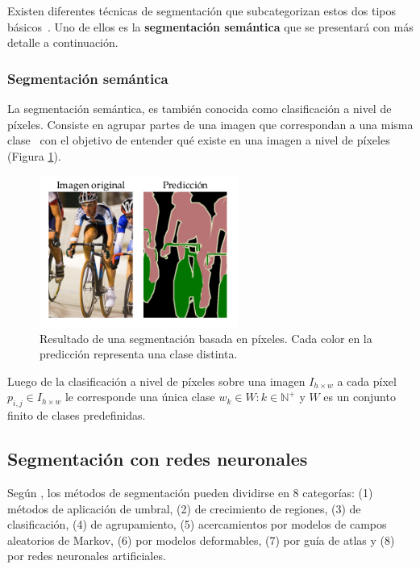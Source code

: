 Existen diferentes técnicas de segmentación que subcategorizan estos dos tipos básicos~\cite{anjna2017review}. Uno de ellos es la \textbf{segmentación semántica} que se presentará con más detalle a continuación.

\subsubsection{Segmentación semántica}

La segmentación semántica, es también conocida como clasificación a nivel de píxeles. Consiste en agrupar partes de una imagen que correspondan a una misma clase~\cite{thoma2016survey} con el objetivo de entender qué existe en una imagen a nivel de píxeles (Figura \ref{fig:semseg}).

\begin{figure}[ht]
	\centering
	\includegraphics[width=6.5cm]{./Graphics/semseg.png}
	\caption{Resultado de una segmentación basada en píxeles. Cada color en la predicción representa una clase distinta.}
	\label{fig:semseg}
\end{figure}

\begin{property}
	Luego de la clasificación a nivel de píxeles sobre una imagen $I_{h \times w}$ a cada píxel $p_{i, j} \in I_{h \times w}$ le corresponde una única clase $w_k \in W: k \in \mathbb{N}^+$ y $W$ es un conjunto finito de clases predefinidas.
\end{property}

\subsection{Segmentación con redes neuronales}\label{sec:nn}

Según \cite{pham2000survey}, los métodos de segmentación pueden dividirse en 8 categorías: (1) métodos de aplicación de umbral, (2) de crecimiento de regiones, (3) de clasificación, (4) de agrupamiento, (5) acercamientos por modelos de campos aleatorios de Markov, (6) por modelos deformables, (7) por guía de atlas y (8) por redes neuronales artificiales.

